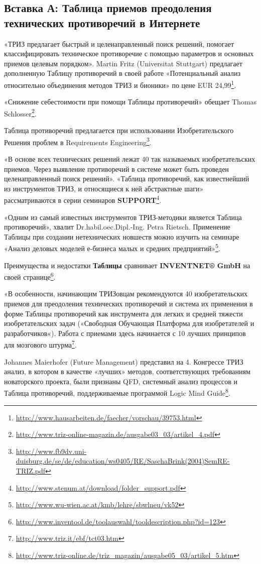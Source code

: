 \documentclass[11pt,a4paper]{article}
\begin{document}
\subsection*{Вставка А: Таблица приемов преодоления технических противоречий в
  Интернете} 

«ТРИЗ предлагает быстрый и целенаправленный поиск решений, помогает
классифицировать техническое противоречие с помощью параметров и основных
приемов целевым порядком». Martin Fritz (Universitat Stuttgart) предлагает
дополненную Таблицу противоречий в своей работе «Потенциальный анализ
относительно объединения методов ТРИЗ и бионики» по цене EUR
24,99\footnote{\url{http://www.hausarbeiten.de/faecher/vorschau/39753.html}}.

«Снижение себестоимости при помощи Таблицы противоречий» обещает Thomas
Schlos\-ser\footnote{\url{http://www.triz-online-magazin.de/ausgabe03_03/artikel_4.pdf}}.

Таблица противоречий предлагается при использовании Изобретательского Решения
проблем в Requirements
Engineering\footnote{\url{http://www.fb9dv.uni-duisburg.de/se/de/education/ws0405/RE/SaschaBrink(2004)SemRE-TRIZ.pdf}}.

«В основе всех технических решений лежат 40 так называемых изобретательских
приемов. Через выявление противоречий в системе может быть проведен
целенаправленный поиск решений». «Таблица противоречий, как известнейший из
инструментов ТРИЗ, и относящиеся к ней абстрактные шаги» рассматриваются в
серии семинаров
\textbf{SUPPORT}\footnote{\url{http://www.stenum.at/download/folder_support.pdf}}.

«Одним из самый известных инструментов ТРИЗ-методики является Таблица
противоречий», хвалит Dr.habil.oec.Dipl.-Ing. Petra Rietsch. Применение
Таблицы при создании нетехнических новшеств можно изучить на семинаре «Анализ
деловых моделей е-бизнеса малых и средних
предприятий»\footnote{\url{http://www.wu-wien.ac.at/kmb/lehre/sbwlneu/vk52}}.

Преимущества и недостатки \textbf{Таблицы} сравнивает \textbf{INVENTNET® GmbH}
на своей
странице\footnote{\url{http://www.inventool.de/toolauswahl/tooldescription.php?id=123}}.

«В особенности, начинающим ТРИЗовцам рекомендуются 40 изобретательских приемов
для преодоления технических противоречий и система их применения в форме
Таблицы противоречий как инструмента для легких и средней тяжести
изобретательских задач («Свободная Обучающая Платформа для изобретателей и
разработчиков«). Работа с приемами здесь начинается с 10 лучших принципов для
мозгового штурма\footnote{\url{http://www.triz.it/ebf/tct03.htm}}.

Johannes Maierhofer (Future Management) представил на 4. Конгрессе ТРИЗ
анализ, в котором в качестве «лучших» методов, соответствующих требованиям
новаторского проекта, были признаны QFD, системный анализ процессов и Таблица
противоречий, поддерживаемые программой Logic Mind
Guide\footnote{\url{http://www.triz-online.de/triz_magazin/ausgabe05_03/artikel_5.htm}}.


\end{document}

